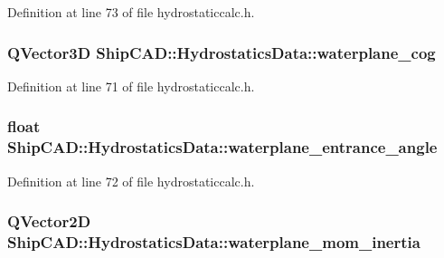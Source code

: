 Definition at line 73 of file hydrostaticcalc.\-h.

\hypertarget{structShipCAD_1_1HydrostaticsData_ac100876d13ae75147585c5c0f80801fe}{
\subsubsection[{waterplane\-\_\-cog}]{\setlength{\rightskip}{0pt plus 5cm}Q\-Vector3\-D Ship\-C\-A\-D\-::\-Hydrostatics\-Data\-::waterplane\-\_\-cog}}\label{structShipCAD_1_1HydrostaticsData_ac100876d13ae75147585c5c0f80801fe}


Definition at line 71 of file hydrostaticcalc.\-h.

\hypertarget{structShipCAD_1_1HydrostaticsData_a3e22cf4f03f02a3c0d14e7f66610fd80}{
\subsubsection[{waterplane\-\_\-entrance\-\_\-angle}]{\setlength{\rightskip}{0pt plus 5cm}float Ship\-C\-A\-D\-::\-Hydrostatics\-Data\-::waterplane\-\_\-entrance\-\_\-angle}}\label{structShipCAD_1_1HydrostaticsData_a3e22cf4f03f02a3c0d14e7f66610fd80}


Definition at line 72 of file hydrostaticcalc.\-h.

\hypertarget{structShipCAD_1_1HydrostaticsData_a2a662521564e9c0160c15acf9d3121f9}{
\subsubsection[{waterplane\-\_\-mom\-\_\-inertia}]{\setlength{\rightskip}{0pt plus 5cm}Q\-Vector2\-D Ship\-C\-A\-D\-::\-Hydrostatics\-Data\-::waterplane\-\_\-mom\-\_\-inertia}}\label{structShipCAD_1_1HydrostaticsData_a2a662521564e9c0160c15acf9d3121f9}


